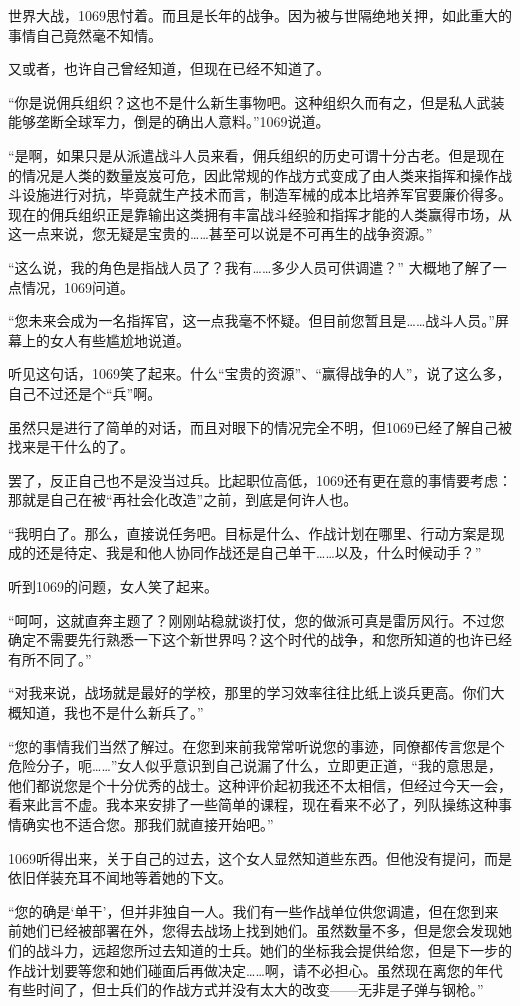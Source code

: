 世界大战，1069思忖着。而且是长年的战争。因为被与世隔绝地关押，如此重大的事情自己竟然毫不知情。

又或者，也许自己曾经知道，但现在已经不知道了。

“你是说佣兵组织？这也不是什么新生事物吧。这种组织久而有之，但是私人武装能够垄断全球军力，倒是的确出人意料。”1069说道。

“是啊，如果只是从派遣战斗人员来看，佣兵组织的历史可谓十分古老。但是现在的情况是人类的数量岌岌可危，因此常规的作战方式变成了由人类来指挥和操作战斗设施进行对抗，毕竟就生产技术而言，制造军械的成本比培养军官要廉价得多。现在的佣兵组织正是靠输出这类拥有丰富战斗经验和指挥才能的人类赢得市场，从这一点来说，您无疑是宝贵的……甚至可以说是不可再生的战争资源。”

“这么说，我的角色是指战人员了？我有……多少人员可供调遣？” 大概地了解了一点情况，1069问道。

“您未来会成为一名指挥官，这一点我毫不怀疑。但目前您暂且是……战斗人员。”屏幕上的女人有些尴尬地说道。

听见这句话，1069笑了起来。什么“宝贵的资源”、“赢得战争的人”，说了这么多，自己不过还是个“兵”啊。

虽然只是进行了简单的对话，而且对眼下的情况完全不明，但1069已经了解自己被找来是干什么的了。

罢了，反正自己也不是没当过兵。比起职位高低，1069还有更在意的事情要考虑：那就是自己在被“再社会化改造”之前，到底是何许人也。

“我明白了。那么，直接说任务吧。目标是什么、作战计划在哪里、行动方案是现成的还是待定、我是和他人协同作战还是自己单干……以及，什么时候动手？”

听到1069的问题，女人笑了起来。

“呵呵，这就直奔主题了？刚刚站稳就谈打仗，您的做派可真是雷厉风行。不过您确定不需要先行熟悉一下这个新世界吗？这个时代的战争，和您所知道的也许已经有所不同了。”

“对我来说，战场就是最好的学校，那里的学习效率往往比纸上谈兵更高。你们大概知道，我也不是什么新兵了。”

“您的事情我们当然了解过。在您到来前我常常听说您的事迹，同僚都传言您是个危险分子，呃……”女人似乎意识到自己说漏了什么，立即更正道，“我的意思是，他们都说您是个十分优秀的战士。这种评价起初我还不太相信，但经过今天一会，看来此言不虚。我本来安排了一些简单的课程，现在看来不必了，列队操练这种事情确实也不适合您。那我们就直接开始吧。”

1069听得出来，关于自己的过去，这个女人显然知道些东西。但他没有提问，而是依旧佯装充耳不闻地等着她的下文。

“您的确是‘单干’，但并非独自一人。我们有一些作战单位供您调遣，但在您到来前她们已经被部署在外，您得去战场上找到她们。虽然数量不多，但是您会发现她们的战斗力，远超您所过去知道的士兵。她们的坐标我会提供给您，但是下一步的作战计划要等您和她们碰面后再做决定……啊，请不必担心。虽然现在离您的年代有些时间了，但士兵们的作战方式并没有太大的改变——无非是子弹与钢枪。”

